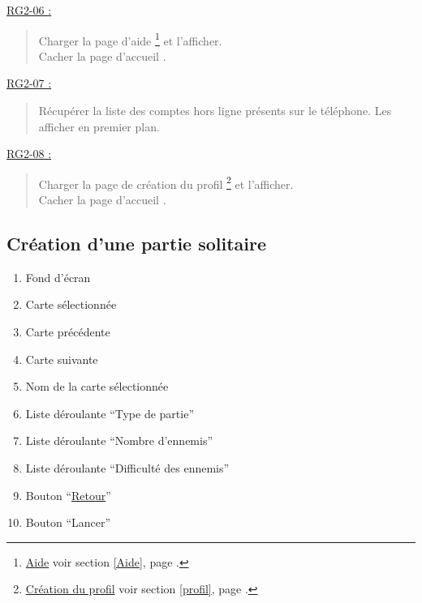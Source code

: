 \documentclass{report}
\begin{document}
		\underline{RG2-06 :}
			\begin{quote}
				Charger la page d'aide%
					\footnote[7]{
						\hyperlink{Aide}{Aide}
						\og voir section \ref{Aide}, page \pageref{Aide}.\fg
					}
				et l'afficher.\\
				Cacher la page d'accueil%
					\footnotemark[2]	
				.\\		
			\end{quote}
			
			
		\underline{RG2-07 :}
			\begin{quote}
				Récupérer la liste des comptes hors ligne présents sur le téléphone.
				Les afficher en premier plan.	
			\end{quote}			


		\underline{RG2-08 :}
			\begin{quote}
				Charger la page de création du profil%
					\footnote[8]{
						\hyperlink{profil}{Création du profil}
						\og voir section \ref{profil}, page \pageref{profil}.\fg
					}
				et l'afficher.\\
				Cacher la page d'accueil%
					\footnotemark[2]
				.\\			
			\end{quote}

	
\newpage

	\subsection{Création d'une partie solitaire}
	
		\hypertarget{Creer partie solo}{}
		\label{Creer partie solo}

		\begin{center}
					
		\end{center}
		
		\begin{enumerate}
		  \item Fond d'écran
		  \item Carte sélectionnée
		  \item Carte précédente
		  \item Carte suivante
		  \item Nom de la carte sélectionnée
		  \item Liste déroulante ``Type de partie''
		  \item Liste déroulante ``Nombre d'ennemis''
		  \item Liste déroulante ``Difficulté des ennemis''
		  \item Bouton ``\hyperlink{Page d'accueil}{Retour}''
		  \item Bouton ``Lancer'' 
		\end{enumerate}
		
\end{document}
